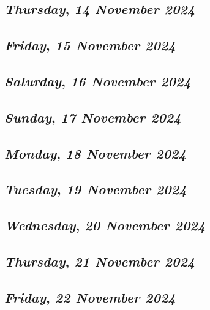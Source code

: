 \def\day{\textit{14 November 2024}}
\def\weekday{\textit{Thursday}}
\subsection*{\weekday, \day}

\def\day{\textit{15 November 2024}}
\def\weekday{\textit{Friday}}
\subsection*{\weekday, \day}

\def\day{\textit{16 November 2024}}
\def\weekday{\textit{Saturday}}
\subsection*{\weekday, \day}

\def\day{\textit{17 November 2024}}
\def\weekday{\textit{Sunday}}
\subsection*{\weekday, \day}

\def\day{\textit{18 November 2024}}
\def\weekday{\textit{Monday}}
\subsection*{\weekday, \day}

\def\day{\textit{19 November 2024}}
\def\weekday{\textit{Tuesday}}
\subsection*{\weekday, \day}

\def\day{\textit{20 November 2024}}
\def\weekday{\textit{Wednesday}}
\subsection*{\weekday, \day}

\def\day{\textit{21 November 2024}}
\def\weekday{\textit{Thursday}}
\subsection*{\weekday, \day}

\def\day{\textit{22 November 2024}}
\def\weekday{\textit{Friday}}
\subsection*{\weekday, \day}

